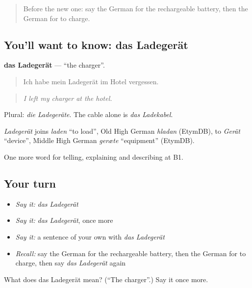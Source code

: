 \begin{quote}
Before the new one: say the German for the rechargeable battery, then the German for to charge.
\end{quote}

\subsection*{You'll want to know: das Ladegerät}
\textbf{das Ladegerät} — \textquotedblleft{}the charger\textquotedblright{}.

\begin{quote}
Ich habe mein Ladegerät im Hotel vergessen.
\end{quote}

\begin{quote}
\emph{I left my charger at the hotel.}
\end{quote}

Plural: \emph{die Ladegeräte}. The cable alone is \emph{das Ladekabel}.

\begin{cousinweb}
\emph{Ladegerät} joins \emph{laden} \textquotedblleft{}to load\textquotedblright{}, Old High German \emph{hladan} (EtymDB), to \emph{Gerät} \textquotedblleft{}device\textquotedblright{}, Middle High German \emph{geræte} \textquotedblleft{}equipment\textquotedblright{} (EtymDB).
\end{cousinweb}

\begin{grammarlens}[title={What you've built}]
One more word for telling, explaining and describing at B1.
\end{grammarlens}

\subsection*{Your turn}
\begin{itemize}
\raggedright
  \item \emph{Say it:} \emph{das Ladegerät}
  \item \emph{Say it:} \emph{das Ladegerät}, once more
  \item \emph{Say it:} a sentence of your own with \emph{das Ladegerät}
  \item \emph{Recall:} say the German for the rechargeable battery, then the German for to charge, then say \emph{das Ladegerät} again
\end{itemize}

\begin{tcolorbox}[breakable,colback=teal!4,colframe=teal!35!black,title={Before you move on}]
What does das Ladegerät mean? (\textquotedblleft{}The charger\textquotedblright{}.) Say it once more.
\end{tcolorbox}
